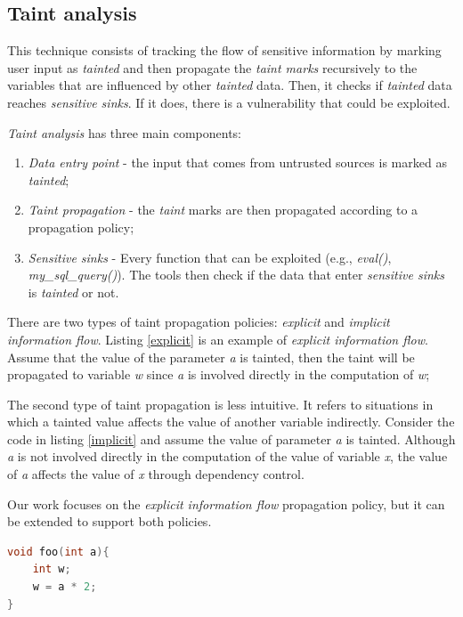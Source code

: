\subsection{Taint analysis}
\label{taintanalysis}

This technique consists of tracking the flow of sensitive information by marking user input as \textit{tainted} and then propagate the \textit{taint marks} recursively to the variables that are influenced by other \textit{tainted} data. Then, it checks if \textit{tainted} data reaches \textit{sensitive sinks}. If it does, there is a vulnerability that could be exploited.

\textit{Taint analysis} has three main components:
\begin{enumerate}
    \item \textit{Data entry point} - the input that comes from untrusted sources is marked as \textit{tainted};
    \item \textit{Taint propagation} - the \textit{taint} marks are then propagated according to a propagation policy;
    \item \textit{Sensitive sinks} - Every function that can be exploited (e.g., \textit{eval()},  \textit{my\_sql\_query()}). The tools then check if the data that enter \textit{sensitive sinks} is \textit{tainted}  or not.
\end{enumerate}

There are two types of taint propagation policies: \textit{explicit} and \textit{implicit information flow}.
Listing \ref{explicit} is an example of \textit{explicit information flow}. Assume that the value of the parameter \textit{a} is tainted, then the taint will be propagated to variable \textit{w} since \textit{a} is involved directly in the computation of \textit{w};

The second type of taint propagation is less intuitive. It refers to situations in which a tainted value affects the value of another variable indirectly. Consider the code in listing \ref{implicit} and assume the value of parameter \textit{a} is tainted. Although \textit{a} is not involved directly in the computation of the value of variable \textit{x}, the value of \textit{a} affects the value of \textit{x} through dependency control. 

Our work focuses on the \textit{explicit information flow} propagation policy, but it can be extended to support both policies.


\begin{lstlisting}[language=C, caption={Explicit information flow},label=explicit,captionpos=b]
void foo(int a){  
    int w;
    w = a * 2;
}  
\end{lstlisting}

